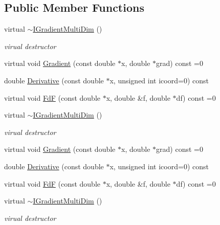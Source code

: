 \subsection*{Public Member Functions}
\begin{DoxyCompactItemize}
\item 
virtual \mbox{\hyperlink{classROOT_1_1Math_1_1IGradientMultiDim_a68ce0f439481e78992945f7d8b8fb42e}{$\sim$\+I\+Gradient\+Multi\+Dim}} ()
\begin{DoxyCompactList}\small\item\em virual destructor \end{DoxyCompactList}\item 
virtual void \mbox{\hyperlink{classROOT_1_1Math_1_1IGradientMultiDim_ac5785e2df4fa36061bf9ddbb9ce4dde0}{Gradient}} (const double $\ast$x, double $\ast$grad) const =0
\item 
double \mbox{\hyperlink{classROOT_1_1Math_1_1IGradientMultiDim_ae131d6cc942c8fcf90a3b575335b30a7}{Derivative}} (const double $\ast$x, unsigned int icoord=0) const
\item 
virtual void \mbox{\hyperlink{classROOT_1_1Math_1_1IGradientMultiDim_ad8d0e31b786327014524483a708d8f82}{FdF}} (const double $\ast$x, double \&f, double $\ast$df) const =0
\item 
virtual \mbox{\hyperlink{classROOT_1_1Math_1_1IGradientMultiDim_a68ce0f439481e78992945f7d8b8fb42e}{$\sim$\+I\+Gradient\+Multi\+Dim}} ()
\begin{DoxyCompactList}\small\item\em virual destructor \end{DoxyCompactList}\item 
virtual void \mbox{\hyperlink{classROOT_1_1Math_1_1IGradientMultiDim_ac5785e2df4fa36061bf9ddbb9ce4dde0}{Gradient}} (const double $\ast$x, double $\ast$grad) const =0
\item 
double \mbox{\hyperlink{classROOT_1_1Math_1_1IGradientMultiDim_ae131d6cc942c8fcf90a3b575335b30a7}{Derivative}} (const double $\ast$x, unsigned int icoord=0) const
\item 
virtual void \mbox{\hyperlink{classROOT_1_1Math_1_1IGradientMultiDim_ad8d0e31b786327014524483a708d8f82}{FdF}} (const double $\ast$x, double \&f, double $\ast$df) const =0
\item 
virtual \mbox{\hyperlink{classROOT_1_1Math_1_1IGradientMultiDim_a68ce0f439481e78992945f7d8b8fb42e}{$\sim$\+I\+Gradient\+Multi\+Dim}} ()
\begin{DoxyCompactList}\small\item\em virual destructor \end{DoxyCompactList}\item 

\end{DoxyCompactItemize}
